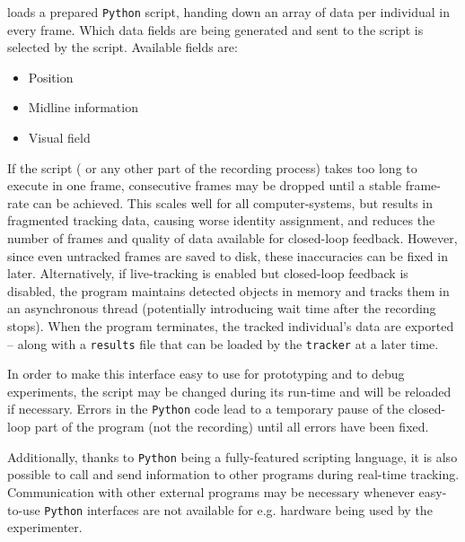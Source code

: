 \documentclass[9pt,lineno]{elife}
\newcommand{\TRex}{\protect\path{TRex}}
\begin{document}
\TRex{} loads a prepared \verb!Python! script, handing down an array of data per individual in every frame. Which data fields are being generated and sent to the script is selected by the script. Available fields are:

\begin{itemize}[label=\textnormal{$\bullet$}]
    \item Position
    \item Midline information
    \item Visual field
\end{itemize}

If the script ({\color{blue} or any other part of the recording process}) takes too long to execute {\color{blue} in one} frame, {\color{blue}consecutive frames may be} dropped until a stable frame-rate can be achieved. This scales well for all computer-systems, {\color{blue} but results in fragmented tracking data, causing worse identity assignment, and reduces the number of frames and quality of data available for closed-loop feedback. However, since even untracked frames are saved to disk, these inaccuracies can be fixed in \TRex{} later. Alternatively, if live-tracking is enabled but closed-loop feedback is disabled, the program maintains detected objects in memory and tracks them in an asynchronous thread (potentially introducing wait time after the recording stops).} When the program terminates, the tracked individual's data are exported -- along with a \verb!results! file that can be loaded by the \verb!tracker! at a later time.

In order to make this interface easy to use for prototyping and to debug experiments, the script may be changed during its run-time and will be reloaded if necessary. Errors in the \verb!Python! code lead to a temporary pause of the closed-loop part of the program (not the recording) until all errors have been fixed.

Additionally, thanks to \verb!Python! being a fully-featured scripting language, it is also possible to call and send information to other programs during real-time tracking. Communication with other external programs may be necessary whenever easy-to-use \verb!Python! interfaces are not available for e.g. hardware being used by the experimenter.

\end{document}
